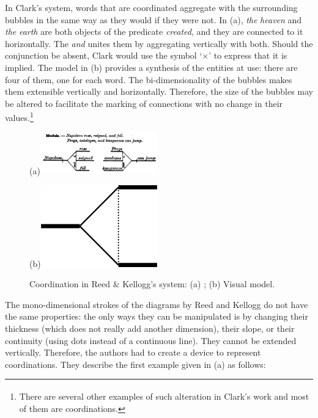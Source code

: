 \documentclass[output=paper]{langsci/langscibook}
\begin{document}
In Clark’s system, words that are coordinated aggregate with the surrounding bubbles in the same way as they would if they were not. In (a), \textit{the} \textit{heaven} and \textit{the} \textit{earth} are both objects of the predicate \textit{created}, and they are connected to it horizontally. The  \textit{and} unites them by aggregating vertically with both. Should the conjunction be absent, Clark would use the symbol ‘×’ to express that it is implied. The model in (b) provides a synthesis of the entities at use: there are four of them, one for each word. The bi-dimensionality of the bubbles makes them extensible vertically and horizontally. Therefore, the size of the bubbles may be altered to facilitate the marking of connections with no change in their values.\footnote{\textrm{\textsuperscript{} }\textrm{There are several other examples of such alteration in Clark’s work and most of them are coordinations.} } 


\begin{figure}
    
    \centering
    (a)\includegraphics[width=0.45\textwidth]{figures/04/Kap.4.img.0008a.jpg}
    
    (b)\includegraphics[width=0.45\textwidth]{figures/04/Kap.4.img.0008b.png}
    
    \caption{ Coordination in Reed \& Kellogg’s system: (a) \citeyear[48]{reed_graded_1879}; (b) Visual model.}
    \label{fig:8}
    
\end{figure}


The mono-dimensional strokes of the diagrams by Reed and Kellogg do not have the same properties: the only ways they can be manipulated is by changing their thickness (which does not really add another dimension), their slope, or their continuity (using dots instead of a continuous line). They cannot be extended vertically. Therefore, the authors had to create a device to represent coordinations. They describe the first example given in (a) as follows:
\end{document}
